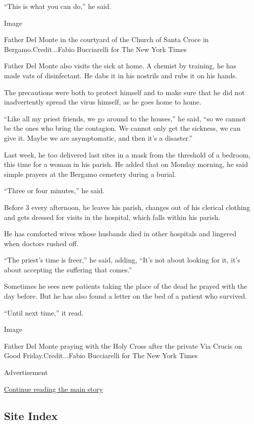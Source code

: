 ``This is what you can do,'' he said.

Image

Father Del Monte in the courtyard of the Church of Santa Croce in
Bergamo.Credit...Fabio Bucciarelli for The New York Times

Father Del Monte also visits the sick at home. A chemist by training, he
has made vats of disinfectant. He dabs it in his nostrils and rubs it on
his hands.

The precautions were both to protect himself and to make sure that he
did not inadvertently spread the virus himself, as he goes home to home.

``Like all my priest friends, we go around to the houses,'' he said,
``so we cannot be the ones who bring the contagion. We cannot only get
the sickness, we can give it. Maybe we are asymptomatic, and then it's a
disaster.''

Last week, he too delivered last rites in a mask from the threshold of a
bedroom, this time for a woman in his parish. He added that on Monday
morning, he said simple prayers at the Bergamo cemetery during a burial.

``Three or four minutes,'' he said.

Before 3 every afternoon, he leaves his parish, changes out of his
clerical clothing and gets dressed for visits in the hospital, which
falls within his parish.

He has comforted wives whose husbands died in other hospitals and
lingered when doctors rushed off.

``The priest's time is freer,'' he said, adding, ``It's not about
looking for it, it's about accepting the suffering that comes.''

Sometimes he sees new patients taking the place of the dead he prayed
with the day before. But he has also found a letter on the bed of a
patient who survived.

``Until next time,'' it read.

Image

Father Del Monte praying with the Holy Cross after the private Via
Crucis on Good Friday.Credit...Fabio Bucciarelli for The New York Times

Advertisement

\protect\hyperlink{after-bottom}{Continue reading the main story}

\hypertarget{site-index}{%
\subsection{Site Index}\label{site-index}}


